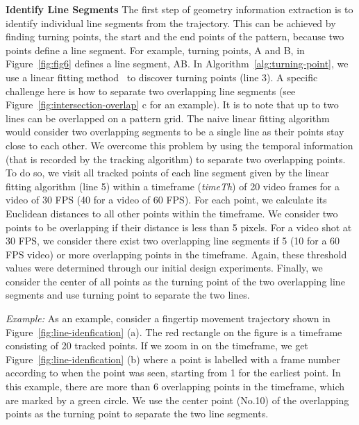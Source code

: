         \noindent \textbf{Identify Line Segments}
        The first step of geometry information extraction is to identify individual
        line segments from the trajectory. This can be achieved
        by finding turning points, the start and the end points of the pattern, because two points define a line segment. For example, turning points, A and B, in
        Figure~\ref{fig:fig6} defines a line segment, AB. In
        Algorithm~\ref{alg:turning-point}, we use a linear fitting
        method~\cite{Kutner2004Applied} to discover turning points (line 3). A specific
        challenge here is how to separate two overlapping line segments (see
        Figure~\ref{fig:intersection-overlap} c for an example).
        It is to note that up to two lines can be overlapped on a pattern grid.
        The naive
        linear fitting algorithm would consider two overlapping segments to be a
        single line as their points stay close to each other. We overcome this problem
       by using the temporal information (that is recorded by the
        tracking algorithm) to separate two overlapping points.
        To do so, we visit all tracked points of each line segment given by the linear fitting algorithm (line
        5) within a timeframe (\emph{timeTh}) of 20 video frames for a video of 30 FPS (40 for a video of 60 FPS).
        For each point, we calculate its Euclidean distances to all other points within the timeframe.
        We consider two points to be overlapping if their distance is less than 5 pixels.
        For a video shot at 30 FPS, we consider there exist two overlapping line segments if 5 (10 for a 60 FPS video) or more overlapping points in the timeframe.
        Again, these threshold values were determined through our initial design experiments.
        Finally, we consider the center of all points as the turning point of the two overlapping line segments and use turning point to separate the two lines.

        \noindent \emph{Example:} As an example, consider a fingertip movement trajectory shown in
        Figure~\ref{fig:line-idenfication} (a). The red rectangle on the
        figure is a timeframe consisting of 20 tracked points.  If we zoom in
        on the timeframe, we get Figure~\ref{fig:line-idenfication} (b) where
        a point is labelled with a frame number according to when
        the point was seen, starting from 1 for the earliest point. In this example, there are more than 6
        overlapping points in the timeframe, which are marked by a green
        circle. We use the center
        point (No.10) of the overlapping points as the turning point to separate the two line segments.

